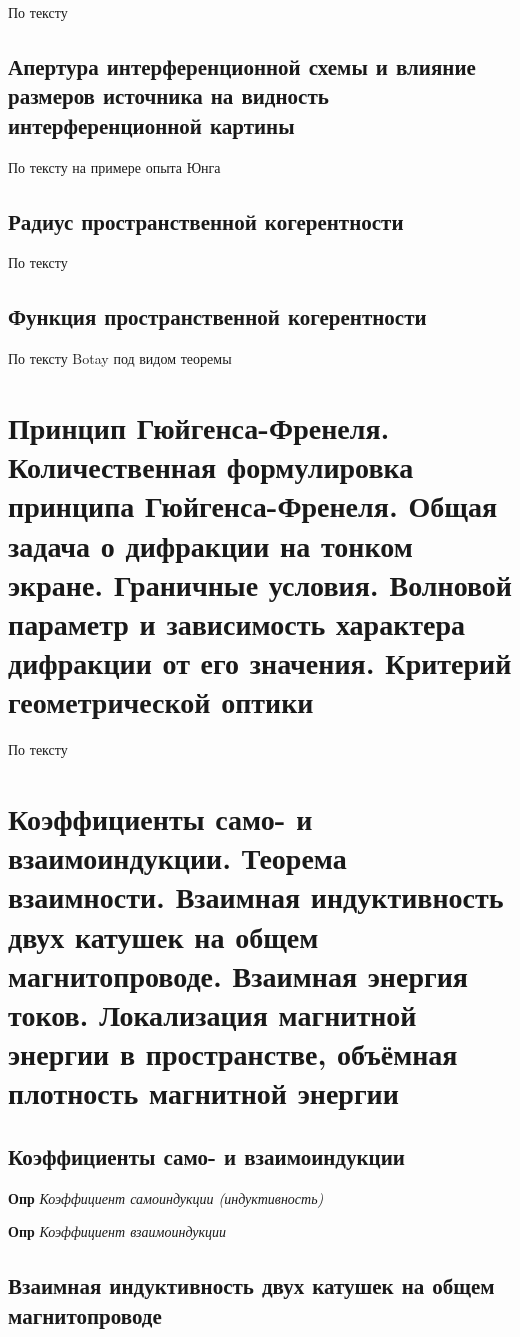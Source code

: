 \documentclass[a4paper, 14pt]{article}
\begin{document}
    По тексту
    
    \subsection{Апертура интерференционной схемы и влияние размеров источника на видность интерференционной картины}
    
    По тексту на примере опыта Юнга
    
    \subsection{Радиус пространственной когерентности}
    
    По тексту
    
    \subsection{Функция пространственной когерентности}
    
    По тексту Botay под видом теоремы
    
    \section{Принцип Гюйгенса-Френеля.
    Количественная формулировка принципа Гюйгенса-Френеля.
    Общая задача о дифракции на тонком экране.
    Граничные условия.
    Волновой параметр и зависимость характера дифракции от его значения.
    Критерий геометрической оптики}
    
    По тексту
    
    \section{Коэффициенты само- и взаимоиндукции.
    Теорема взаимности.
    Взаимная индуктивность двух катушек на общем магнитопроводе.
    Взаимная энергия токов.
    Локализация магнитной энергии в пространстве, объёмная плотность магнитной энергии}
    
    \subsection{Коэффициенты само- и взаимоиндукции}
    
    \textbf{Опр} \textit{Коэффициент самоиндукции (индуктивность)}
    
    \textbf{Опр} \textit{Коэффициент взаимоиндукции}
    
    \subsection{Взаимная индуктивность двух катушек на общем магнитопроводе}
    
\end{document}
